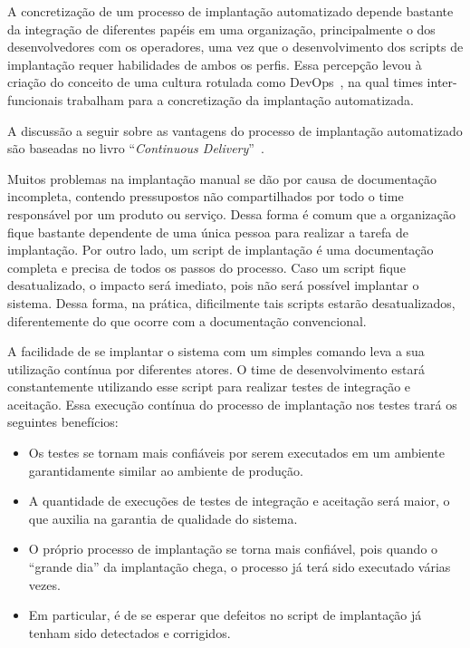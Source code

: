 A concretização de um processo de implantação automatizado depende bastante da
integração de diferentes papéis em uma organização, principalmente o dos desenvolvedores
com os operadores, uma vez que o desenvolvimento dos scripts de implantação requer
habilidades de ambos os perfis.
Essa percepção levou à criação do conceito de uma cultura 
rotulada como DevOps~\cite{Humble2011DevOps}, na qual times inter-funcionais
trabalham para a concretização da implantação automatizada.

A discussão a seguir sobre as vantagens do processo de implantação automatizado
são baseadas no livro ``\emph{Continuous Delivery}''~\cite{Humble2011Continuous}.

Muitos problemas na implantação manual se dão por causa de documentação incompleta,
contendo pressupostos não compartilhados por todo o time responsável por um produto ou serviço.
Dessa forma é comum que a organização fique bastante dependente de uma única
pessoa para realizar a tarefa de implantação.
Por outro lado, um script de implantação é uma documentação completa e precisa de todos os passos
do processo. Caso um script fique desatualizado, o impacto será imediato, pois
não será possível implantar o sistema. Dessa forma, na prática,
dificilmente tais scripts estarão desatualizados,
diferentemente do que ocorre com a documentação convencional.

A facilidade de se implantar o sistema com um simples comando
leva a sua utilização contínua por diferentes atores.
O time de desenvolvimento estará constantemente utilizando esse script 
para realizar testes de integração e aceitação. 
Essa execução contínua do processo de implantação nos testes trará os seguintes benefícios:

\begin{itemize}
\item Os testes se tornam mais confiáveis por serem executados em um ambiente garantidamente similar ao ambiente de produção.
\item A quantidade de execuções de testes de integração e aceitação será maior, o que auxilia na garantia de qualidade do sistema.
\item O próprio processo de implantação se torna mais confiável, pois quando o ``grande dia'' da implantação chega, o processo já terá sido executado várias vezes.
\item Em particular, é de se esperar que defeitos no script de implantação já tenham sido detectados e corrigidos.
\end{itemize}

